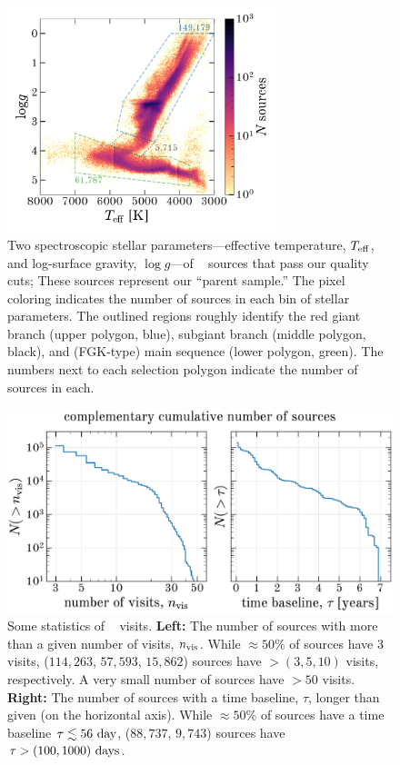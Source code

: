 \documentclass[modern]{aastex63}
\begin{document}
\begin{figure}[!t]
\begin{center}
\includegraphics[width=0.7\textwidth]{specHR.pdf}
\end{center}
\caption{%
Two spectroscopic stellar parameters---effective temperature, $T_{\rm eff}$, and
log-surface gravity, $\log g$---of \apogee\  sources that pass our
quality cuts; These sources represent our ``parent sample.''
The pixel coloring indicates the number of sources in each bin of stellar
parameters.
The outlined regions roughly identify the red giant branch (upper polygon,
blue), subgiant branch (middle polygon, black), and (FGK-type) main sequence
(lower polygon, green).
The numbers next to each selection polygon indicate the number of sources in
each.
\label{fig:specHR}
}
\end{figure}

\begin{figure}[!t]
\begin{center}
\includegraphics[width=1\textwidth]{visitstats.pdf}
\end{center}
\caption{%
Some statistics of \apogee\  visits.
\textbf{Left:} The number of sources with more than a given number of visits,
$n_{\rm vis}$.
While $\approx$$50\%$ of sources have 3 visits, ($114,263$, $57,593$, $15,862$)
sources have $> (3, 5, 10)$ visits, respectively.
A very small number of sources have $>50$ visits.
\textbf{Right:} The number of sources with a time baseline, $\tau$, longer than
given (on the horizontal axis).
While $\approx$$50\%$ of sources have a time baseline $\tau \lesssim 56~{\rm
day}$, ($88,737$, $9,743$) sources have $\tau > (100, 1000)~{\rm days}$.
\label{fig:visitstats}
}
\end{figure}
\end{document}
